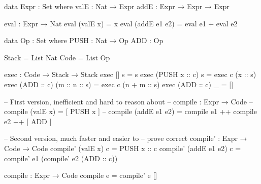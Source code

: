 \documentclass[a4paper,UKenglish]{tufte-handout}
\theoremstyle{definition}
\newtheorem{exercise}{Exercise}[section]
\newcommand\fun[1]{{\AgdaFunction{#1}}}
\begin{document}
\begin{AgdaAlign}
\begin{AgdaSuppressSpace}
\begin{fullwidth}
\begin{code}[number]
data Expr : Set where
  valE  : Nat → Expr
  addE  : Expr → Expr → Expr

\end{code}

\begin{code}[number]
eval : Expr → Nat
eval (valE x)      = x
eval (addE e1 e2)  = eval e1 + eval e2

\end{code}

\begin{code}[number]
data Op : Set where
  PUSH  : Nat → Op
  ADD   : Op

\end{code}

\begin{code}[number]
Stack  = List Nat
Code   = List Op

\end{code}

\begin{code}[number]
exec : Code → Stack → Stack
exec []             s              = s
exec (PUSH x :: c)  s              = exec c (x :: s)
exec (ADD    :: c)  (m :: n :: s)  = exec c (n + m :: s)
exec (ADD    :: c)  _              = []

\end{code}

\begin{code}[number]
-- First version, inefficient and hard to reason about
-- compile : Expr → Code
-- compile (valE x)     = [ PUSH x ]
-- compile (addE e1 e2) = compile e1 ++ compile e2 ++ [ ADD ]

-- Second version, much faster and easier to
-- prove correct
compile' : Expr → Code → Code
compile' (valE x)      c  = PUSH x :: c
compile' (addE e1 e2)  c  = compile' e1 (compile' e2 (ADD :: c))

compile : Expr → Code
compile e = compile' e []

\end{code}

%
%


\end{fullwidth}
\end{AgdaSuppressSpace}
\end{AgdaAlign}
\end{document}
